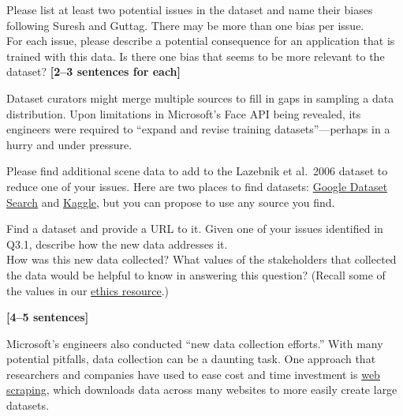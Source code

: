 \documentclass{csci1430}
\begin{document}
\pagebreak
\begin{subquestion}[points=4]
Please list at least two potential issues in the dataset and name their biases following Suresh and Guttag. There may be more than one bias per issue. \\

For each issue, please describe a potential consequence for an application that is trained with this data. Is there one bias that seems to be more relevant to the dataset? \textbf{[2--3 sentences for each]}
\end{subquestion}

\begin{answer}[height=20]

\end{answer}

\pagebreak
Dataset curators might merge multiple sources to fill in gaps in sampling a data distribution. Upon limitations in Microsoft's Face API being revealed, its engineers were required to ``expand and revise training datasets''---perhaps in a hurry and under pressure. 

Please find additional scene data to add to the Lazebnik et al.~2006 dataset to reduce one of your issues. Here are two places to find datasets: \href{https://datasetsearch.research.google.com}{Google Dataset Search} and \href{https://www.kaggle.com}{Kaggle}, but you can propose to use any source you find.

\begin{subquestion}[points=4]
Find a dataset and provide a URL to it. Given one of your issues identified in Q3.1, describe how the new data addresses it. \\

How was this new data collected?
What values of the stakeholders that collected the data would be helpful to know in answering this question?
(Recall some of the values in our \href{https://browncsci1430.github.io/resources/ethics_primer/}{ethics resource}.)

\textbf{[4--5 sentences]}
\end{subquestion}

\begin{answer}[height=20]

\end{answer}

\pagebreak
Microsoft's engineers also conducted ``new data collection efforts.'' With many potential pitfalls, data collection can be a daunting task.
One approach that researchers and companies have used to ease cost and time investment is 
\href{https://en.wikipedia.org/wiki/Web_scraping#}{web scraping}, which downloads data across many websites to more easily create large datasets. 
\end{document}
